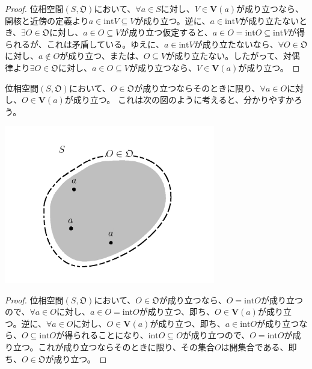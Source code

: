 \documentclass[dvipdfmx]{jsarticle}
\begin{document}
\begin{proof}
位相空間$\left( S,\mathfrak{O} \right)$において、$\forall a \in S$に対し、$V \in \mathbf{V}(a)$が成り立つなら、開核と近傍の定義より$a \in {\mathrm{int}}V \subseteq V$が成り立つ。逆に、$a \in {\mathrm{int}}V$が成り立たないとき、$\exists O \in \mathfrak{O}$に対し、$a \in O \subseteq V$が成り立つ仮定すると、$a \in O = {\mathrm{int}}O \subseteq {\mathrm{int}}V$が得られるが、これは矛盾している。ゆえに、$a \in {\mathrm{int}}V$が成り立たないなら、$\forall O \in \mathfrak{O}$に対し、$a \notin O$が成り立つ、または、$O \subseteq V$が成り立たない。したがって、対偶律より$\exists O \in \mathfrak{O}$に対し、$a \in O \subseteq V$が成り立つなら、$V \in \mathbf{V}(a)$が成り立つ。
\end{proof}
\begin{thm}\label{8.1.1.23}
位相空間$\left( S,\mathfrak{O} \right)$において、$O \in \mathfrak{O}$が成り立つならそのときに限り、$\forall a \in O$に対し、$O \in \mathbf{V}(a)$が成り立つ。
これは次の図のように考えると、分かりやすかろう。
\begin{center}
  \includegraphics[width=92mm]{8.1.1.j.PNG}
\end{center}
\end{thm}
\begin{proof}
位相空間$\left( S,\mathfrak{O} \right)$において、$O \in \mathfrak{O}$が成り立つなら、$O = {\mathrm{int}}O$が成り立つので、$\forall a \in O$に対し、$a \in O = {\mathrm{int}}O$が成り立つ、即ち、$O \in \mathbf{V}(a)$が成り立つ。逆に、$\forall a \in O$に対し、$O \in \mathbf{V}(a)$が成り立つ、即ち、$a \in {\mathrm{int}}O$が成り立つなら、$O \subseteq {\mathrm{int}}O$が得られることになり、${\mathrm{int}}O \subseteq O$が成り立つので、$O = {\mathrm{int}}O$が成り立つ。これが成り立つならそのときに限り、その集合$O$は開集合である、即ち、$O \in \mathfrak{O}$が成り立つ。
\end{proof}
\end{document}
